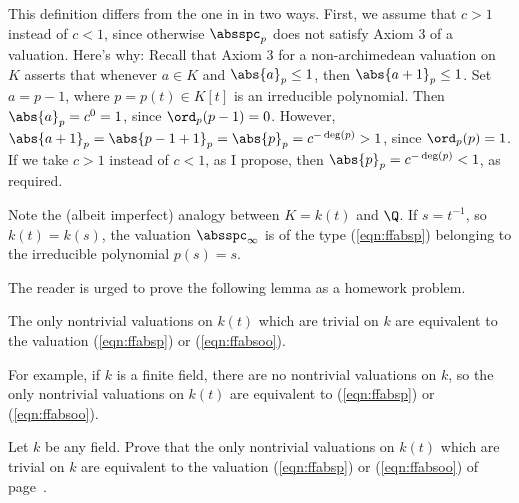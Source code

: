 \documentclass[11pt]{book}
\begin{document}
\begin{ch}
This definition differs from the one in \cite[pg.~46]{cassels:global}
in two ways.  First, we assume that $c>1$ instead of $c<1$, since
otherwise $\absspc_p$ does not satisfy Axiom 3 of a valuation.  Here's
why: Recall that Axiom 3 for a non-archimedean valuation on $K$
asserts that whenever $a\in K$ and $\abs{a}_p\leq 1$, then
$\abs{a+1}_p\leq 1$.  Set $a=p-1$, where $p=p(t)\in K[t]$ is an
irreducible polynomial.  Then $\abs{a}_p=c^0 = 1$, since $\ord_p(p-1) =
0$.  However, $\abs{a+1}_p = \abs{p-1+1}_p = \abs{p}_p=c^{-\deg(p)}>1$, since
$\ord_p(p) = 1$.  If we take $c>1$ instead of $c<1$, as I propose,
then $\abs{p}_p=c^{-\deg(p)}<1$, as required.


Note the (albeit imperfect) analogy between $K=k(t)$ and $\Q$.
If $s=t^{-1}$, so $k(t)=k(s)$, the valuation $\absspc_{\infty}$
is of the type (\ref{eqn:ffabsp}) belonging to the irreducible
polynomial $p(s)=s$.

The reader is urged to prove the following lemma as a homework
problem.
\begin{lemma}
The only nontrivial valuations on $k(t)$ which are trivial
on $k$ are equivalent to the valuation (\ref{eqn:ffabsp})
or (\ref{eqn:ffabsoo}).
\end{lemma}
For example, if $k$ is a finite field, there are no
nontrivial valuations on $k$, so the only
nontrivial valuations on $k(t)$ are equivalent to
(\ref{eqn:ffabsp}) or (\ref{eqn:ffabsoo}).

\begin{exercise} \label{ex:valuations2}
Let $k$ be any field. Prove that the only nontrivial valuations
on $k(t)$ which are trivial on $k$ are equivalent to the valuation
(\ref{eqn:ffabsp}) or (\ref{eqn:ffabsoo}) of page~\pageref{eqn:ffabsp}.
\end{exercise}
\end{ch}
\end{document}
